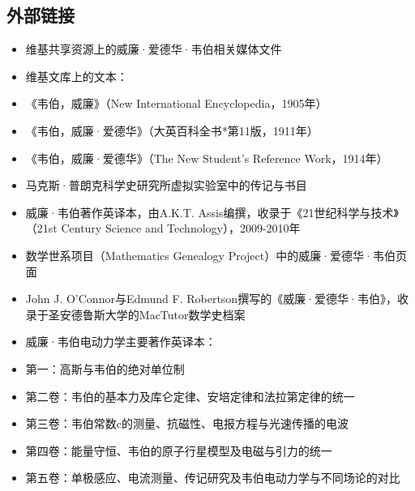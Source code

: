 \subsection{外部链接}  
\begin{itemize}
\item 维基共享资源上的威廉·爱德华·韦伯相关媒体文件  
\item 维基文库上的文本：  
    \item 《韦伯，威廉》（New International Encyclopedia，1905年）  
    \item 《韦伯，威廉·爱德华》（大英百科全书*第11版，1911年）  
    \item 《韦伯，威廉·爱德华》（The New Student's Reference Work，1914年）  
\item 马克斯·普朗克科学史研究所虚拟实验室中的传记与书目  
\item 威廉·韦伯著作英译本，由A.K.T. Assis编撰，收录于《21世纪科学与技术》（21st Century Science and Technology），2009-2010年  
\item 数学世系项目（Mathematics Genealogy Project）中的威廉·爱德华·韦伯页面  
\item John J. O'Connor与Edmund F. Robertson撰写的《威廉·爱德华·韦伯》，收录于圣安德鲁斯大学的MacTutor数学史档案 
\item 威廉·韦伯电动力学主要著作英译本：  
    \item 第一：高斯与韦伯的绝对单位制  
    \item 第二卷：韦伯的基本力及库仑定律、安培定律和法拉第定律的统一  
    \item 第三卷：韦伯常数c的测量、抗磁性、电报方程与光速传播的电波  
    \item 第四卷：能量守恒、韦伯的原子行星模型及电磁与引力的统一  
    \item 第五卷：单极感应、电流测量、传记研究及韦伯电动力学与不同场论的对比 
\end{itemize} 